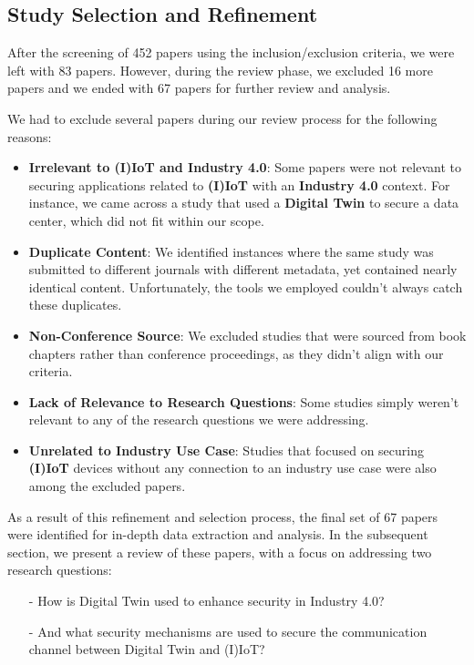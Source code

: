 \subsection{Study Selection and Refinement}

After the screening of 452 papers using the inclusion/exclusion criteria, we were left with 83 papers. However, during the review phase, we excluded 16 more papers and we ended with 67 papers for further review and analysis. 


We had to exclude several papers during our review process for the following reasons:
\begin{itemize}
   \item \textbf{Irrelevant to (I)IoT and Industry 4.0}: Some papers were not relevant to securing applications related to \textbf{(I)IoT} with an \textbf{Industry 4.0} context. For instance, we came across a study that used a \textbf{Digital Twin} to secure a data center, which did not fit within our scope.

    \item \textbf{Duplicate Content}: We identified instances where the same study was submitted to different journals with different metadata, yet contained nearly identical content. Unfortunately, the tools we employed couldn't always catch these duplicates.
    
    \item \textbf{Non-Conference Source}: We excluded studies that were sourced from book chapters rather than conference proceedings, as they didn't align with our criteria.
    
    \item \textbf{Lack of Relevance to Research Questions}: Some studies simply weren't relevant to any of the research questions we were addressing.
    
    \item \textbf{Unrelated to Industry Use Case}: Studies that focused on securing \textbf{(I)IoT} devices without any connection to an industry use case were also among the excluded papers.
    
\end{itemize}

As a result of this refinement and selection process, the final set of 67 papers were identified for in-depth data extraction and analysis. In the subsequent section, we present a review of these papers, with a focus on addressing two research questions:\begin{itemize}
    \item[-] How is Digital Twin used to enhance security in Industry 4.0?
    \item[-] And what security mechanisms are used to secure the communication channel between Digital Twin and (I)IoT? 
\end{itemize} 

 




